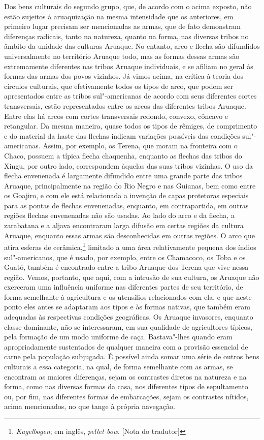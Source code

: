 Dos bens culturais do segundo grupo, que, de acordo com o acima exposto,
não estão sujeitos à aruaquização na mesma intensidade que os
anteriores, em primeiro lugar precisam ser mencionadas as armas, que de
fato demonstram diferenças radicais, tanto na natureza, quanto na
forma, nas diversas tribos no âmbito da unidade das culturas Aruaque. No
entanto, arco e flecha são difundidos universalmente no território
Aruaque todo, mas as formas dessas armas são extremamente diferentes nas
tribos Aruaque individuais, e se afiliam no geral às formas das armas
dos povos vizinhos. Já vimos acima, na crítica à teoria dos círculos
culturais, que efetivamente todos os tipos de arco, que podem ser
apresentados entre as tribos sul"-americanas de acordo com seus
diferentes cortes transversais, estão representados entre os arcos das
diferentes tribos Aruaque. Entre elas há arcos com cortes transversais
redondo, convexo, côncavo e retangular. Da mesma maneira, quase todos
os tipos de rêmiges, de comprimento e do material da haste das flechas
indicam variações possíveis das condições sul"-americanas. Assim, por
exemplo, os Terena, que moram na fronteira com o Chaco, possuem a típica
flecha chaquenha, enquanto as flechas das tribos do Xingu, por outro
lado, correspondem àquelas das suas tribos vizinhas. O uso da flecha
envenenada é largamente difundido entre uma grande parte das tribos
Aruaque, principalmente na região do Rio Negro e nas Guianas, bem como
entre os Goajiro, e com ele está relacionada a invenção de capas
protetoras especiais para as pontas de flechas envenenadas, enquanto,
em contrapartida, em outras regiões flechas envenenadas não são usadas.
Ao lado do arco e da flecha, a zarabatana e a aljava encontraram larga
difusão em certas regiões da cultura Aruaque, enquanto essas armas são
desconhecidas em outras regiões. O arco que atira esferas de cerâmica,\footnote[*]{
\emph{Kugelbogen}; em inglês, \emph{pellet bow}. {[}Nota do tradutor{]}} limitado a
uma área relativamente pequena dos índios sul"-americanos, que é usado,
por exemplo, entre os Chamacoco, os Toba e os Guató, também é encontrado
entre a tribo Aruaque dos Terena que vive nessa região. Vemos, portanto,
que aqui, com a intrusão de sua cultura, os Aruaque não exerceram uma
influência uniforme nas diferentes partes de seu território, de forma
semelhante à agricultura e os utensílios relacionados com ela, e que
neste ponto eles antes se adaptaram aos tipos e às formas nativas, que
também eram adequadas às respectivas condições geográficas. Os Aruaque
invasores, enquanto classe dominante, não se interessaram, em sua
qualidade de agricultores típicos, pela formação de um modo uniforme de
caça. Bastava"-lhes quando eram apropriadamente sustentados de qualquer
maneira com a provisão essencial de carne pela população subjugada. É
possível ainda somar uma série de outros bens culturais a essa
categoria, na qual, de forma semelhante com as armas, se encontram as
maiores diferenças, sejam os contrastes diretos na natureza e na forma,
como nas diversas formas da casa, nos diferentes tipos de sepultamento
ou, por fim, nas diferentes formas de embarcações, sejam os contrastes
nítidos, acima mencionados, no que tange à própria navegação.

